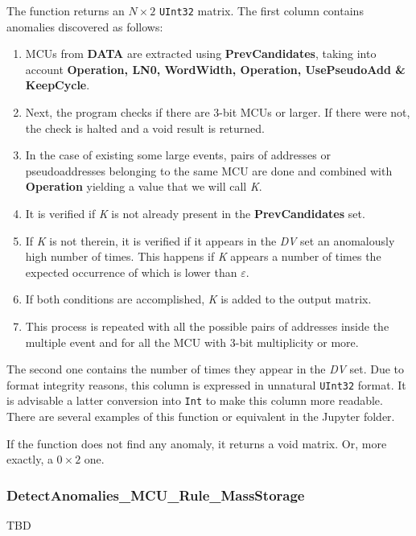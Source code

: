 \begin{itemize}
\begin{itemize}
 	\end{itemize}
 	
 	The function returns an \(N\times 2\) \texttt{UInt32} matrix. The first column contains anomalies discovered as follows:
 	
 	\begin{enumerate}
 		\item MCUs from \textbf{DATA} are extracted using \textbf{PrevCandidates}, taking into account \textbf{Operation, LN0, WordWidth, Operation, UsePseudoAdd \& KeepCycle}.
 		\item Next, the program checks if there are 3-bit MCUs or larger. If there were not, the check is halted and a void result is returned.
 		\item In the case of existing some large events, pairs of addresses or pseudoaddresses belonging to the same MCU are done and combined with \textbf{Operation} yielding a value that we will call  \textit{K}.
 		\item It is verified if \textit{K} is not already present in the \textbf{PrevCandidates} set.
 		\item If \textit{K} is not therein, it is verified if it appears in the \textit{DV} set an anomalously high number of times. This happens if \textit{K} appears a number of times the expected occurrence of which is lower than \textbf{\(\varepsilon\)}.
 		\item If both conditions are accomplished, \textit{K} is added to the output matrix.
 		\item This process is repeated with all the possible pairs of addresses inside the multiple event and for all the MCU with 3-bit multiplicity or more.
 	\end{enumerate}
 	
 	The second one contains the number of times they appear in the \textit{DV} set. Due to format integrity reasons, this column is expressed in unnatural \texttt{UInt32} format. It is advisable a latter conversion into \texttt{Int} to make this column more readable. There are several examples of this function or equivalent in the Jupyter folder.
 	
 	If the function does not find any anomaly, it returns a void matrix.  Or, more exactly, a \(0\times 2\) one.
 	
 \end{itemize}
 \subsubsection*{DetectAnomalies\_MCU\_Rule\_MassStorage}\label{Fun:DetectAnomaliesMCURule_MassStorage}
 TBD
